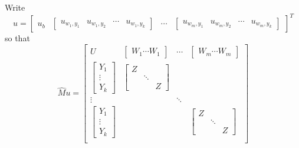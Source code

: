 \documentclass{article}
\begin{document}
Write \[ 
u = 
\begin{bmatrix}u_b & 
\begin{bmatrix} u_{w_1,y_1} & u_{w_1,y_2} & \cdots & u_{w_1,y_k}   \end{bmatrix} &
\cdots &
\begin{bmatrix} u_{w_m,y_1} & u_{w_m,y_2} & \cdots &  u_{w_m,y_k}   \end{bmatrix}
\end{bmatrix}^T
\]
so that 
\[
\hat{M}u = 
\begin{bmatrix}
	U & \begin{bmatrix}W_1\cdots W_1 \end{bmatrix} & \cdots & \begin{bmatrix}W_m\cdots W_m \end{bmatrix} \\

	\begin{bmatrix} Y_1 \\ \vdots \\ Y_k \end{bmatrix} & \begin{bmatrix} Z \\ & \ddots \\ & & Z \end{bmatrix} \\
	
	\vdots & & \ddots & \\
	
	\begin{bmatrix} Y_1 \\ \vdots \\ Y_k \end{bmatrix} & & & \begin{bmatrix} Z \\ & \ddots \\ & & Z \end{bmatrix} \\
	

\end{bmatrix}\]
\end{document}
